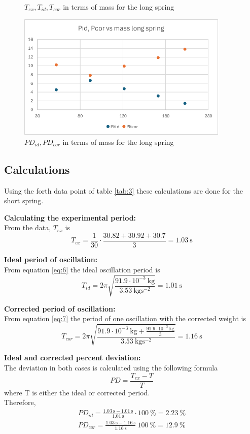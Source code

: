 \documentclass[a4paper, 10pt]{article}
\newcommand{\unit}[1]{~\mathrm{#1}}
\begin{document}
\begin{justify}
\begin{figure}[!h]
    \caption{$T_{ex}, T_{id}, T_{cor}$ in terms of mass for the long spring}
\end{figure}
\begin{figure}[!h]
    \centering
    \includegraphics[width = 0.9\textwidth]{Longspring_deviation.png}
    \caption{$PD_{id}, PD_{cor}$ in terms of mass for the long spring}
\end{figure}
\newpage
\subsection{Calculations}
Using the forth data point of table \ref{tab:3} these calculations are done for
the short spring.
\par
\textbf{Calculating the experimental period:}
\\
From the data, $T_{ex}$ is
\[T_{ex} = \frac{1}{30} \cdot \frac{30.82 + 30.92 + 30.7}{3} = 1.03\unit{s}\]
\par
\textbf{Ideal period of oscillation:}
\\
From equation \ref{eq:6} the ideal oscillation period is
\[ T_{id} = 2 \pi \sqrt{\frac{91.9 \cdot 10^{-3}\unit{kg}}{3.53 \unit{kg
s^{-2}}}} = 1.01\unit{s}\]
\par
\textbf{Corrected period of oscillation:}
\\
From equation \ref{eq:7} the period of one oscillation with the corrected weight
is 
\[ T_{cor} = 2 \pi \sqrt{\frac{91.9 \cdot 10^{-3}\unit{kg} + \frac{91.9\cdot
10^{-3}\unit{kg}}{3}}{3.53 \unit{kgs^{-2}}}} = 1.16\unit{s}\]
\par
\textbf{Ideal and corrected percent deviation:}\\
The deviation in both cases is calculated using the following formula
\begin{equation}
    PD = \frac{T_{ex} - T}{T}
\end{equation}
where T is either the ideal or corrected period.\\
Therefore, 
\begin{gather*}
    PD_{id} = \frac{1.03\unit{s} - 1.01\unit{s}}{1.01\unit{s}}\cdot100\unit{\%} = 2.23\unit{\%}\\
    PD_{cor} = \frac{1.03\unit{s} - 1.16\unit{s}}{1.16\unit{s}}~100\unit{\%} = 12.9\unit{\%}
\end{gather*}

\end{justify}
\end{document}
